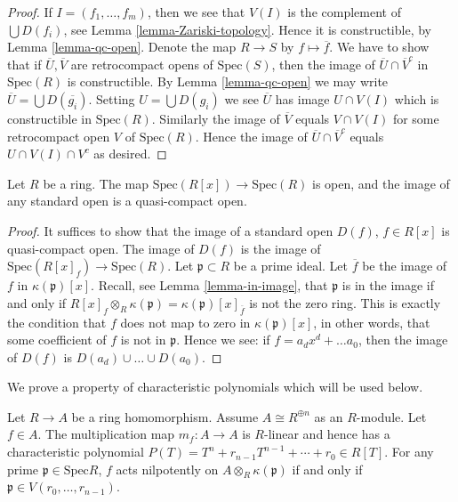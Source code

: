 \begin{proof}
If $I = (f_1, \ldots, f_m)$, then we see that
$V(I)$ is the complement of $\bigcup D(f_i)$,
see Lemma \ref{lemma-Zariski-topology}.
Hence it is constructible, by Lemma \ref{lemma-qc-open}.
Denote the map $R \to S$ by $f \mapsto \overline{f}$.
We have to show that if $\overline{U}, \overline{V}$
are retrocompact opens of $\text{Spec}(S)$, then the
image of $\overline{U} \cap \overline{V}^c$
in $\text{Spec}(R)$ is constructible.
By Lemma \ref{lemma-qc-open} we may write
$\overline{U} = \bigcup D(\overline{g_i})$.
Setting $U = \bigcup D({g_i})$ we see $\overline{U}$
has image $U \cap V(I)$ which is constructible in
$\text{Spec}(R)$. Similarly the image of $\overline{V}$ equals
$V \cap V(I)$ for some retrocompact open $V$ of $\text{Spec}(R)$.
Hence the image of $\overline{U} \cap \overline{V}^c$
equals $U \cap V(I) \cap V^c$ as desired.
\end{proof}

\begin{lemma}
\label{lemma-affineline-open}
Let $R$ be a ring. The map $\text{Spec}(R[x]) \to \text{Spec}(R)$
is open, and the image of any standard open is a quasi-compact
open.
\end{lemma}

\begin{proof}
It suffices to show that the image of a standard open
$D(f)$, $f\in R[x]$ is quasi-compact open.
The image of $D(f)$ is the image of
$\text{Spec}(R[x]_f) \to \text{Spec}(R)$.
Let $\mathfrak p \subset R$ be a prime ideal.
Let $\overline{f}$ be the image of $f$ in
$\kappa(\mathfrak p)[x]$.
Recall, see Lemma \ref{lemma-in-image},
that $\mathfrak p$ is in the image
if and only if $R[x]_f \otimes_R \kappa(\mathfrak p) =
\kappa(\mathfrak p)[x]_{\overline{f}}$ is not the
zero ring. This is exactly the condition that $f$ does not map
to zero in $\kappa(\mathfrak p)[x]$, in other words, that
some coefficient of $f$ is not in $\mathfrak p$.
Hence we see: if $f = a_d x^d + \ldots a_0$, then
the image of $D(f)$ is $D(a_d) \cup \ldots \cup D(a_0)$.
\end{proof}

\noindent
We prove a property of characteristic polynomials which
will be used below.

\begin{lemma}
\label{lemma-characteristic-polynomial-prime}
Let $R \to A$ be a ring homomorphism.
Assume $A \cong R^{\oplus n}$ as an $R$-module.
Let $f \in A$. The multiplication map $m_f: A
\to A$ is $R$-linear and hence
has a characteristic polynomial
$P(T) = T^n + r_{n-1}T^{n-1} + \cdots + r_0 \in R[T]$.
For any prime
$\mathfrak{p} \in \text{Spec} R$, $f$ acts nilpotently on $A
\otimes_R \kappa(\mathfrak{p})$ if and only if $\mathfrak p \in
V(r_0, \ldots, r_{n-1})$.
\end{lemma}

